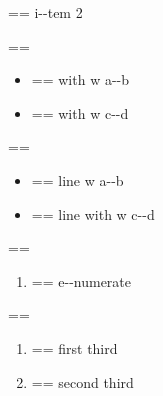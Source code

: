 \documentclass{book}
\makeatletter
\newenvironment{Texinfopreformatted}{%
  \par\GNUTobeylines\obeyspaces\frenchspacing\parskip=\z@\parindent=\z@}{}
{\catcode`\^^M=13 \gdef\GNUTobeylines{\catcode`\^^M=13 \def^^M{\null\par}}}
\newenvironment{Texinfoindented}{\begin{list}{}{}\item\relax}{\end{list}}
\renewcommand{\_}{\Texinfounderscore\discretionary{}{}{}}
\makeatother
\begin{document}
\begin{Texinfoindented}
\begin{itemize}[label=\textbullet{} a--n itemize line]
\begin{Texinfopreformatted}
\ttfamily i{-}{-}tem 2
\end{Texinfopreformatted}
\end{itemize}
\begin{Texinfopreformatted}%
\ttfamily 
\end{Texinfopreformatted}
\begin{itemize}[label={}]
\item \begin{Texinfopreformatted}%
\ttfamily with w a{-}{-}b
\end{Texinfopreformatted}
\item \begin{Texinfopreformatted}%
\ttfamily with w c{-}{-}d
\end{Texinfopreformatted}
\end{itemize}
\begin{Texinfopreformatted}%
\ttfamily 
\end{Texinfopreformatted}
\begin{itemize}[label=\hbox{} on a line]
\item \begin{Texinfopreformatted}%
\ttfamily line w a{-}{-}b
\end{Texinfopreformatted}
\item \begin{Texinfopreformatted}%
\ttfamily line with w c{-}{-}d
\end{Texinfopreformatted}
\end{itemize}
\begin{Texinfopreformatted}%
\ttfamily 
\end{Texinfopreformatted}
\begin{enumerate}[start=1]
\item \begin{Texinfopreformatted}%
\ttfamily e{-}{-}numerate
\end{Texinfopreformatted}
\end{enumerate}
\begin{Texinfopreformatted}%
\ttfamily 
\end{Texinfopreformatted}
\begin{enumerate}[start=3]
\item \begin{Texinfopreformatted}%
\ttfamily first third
\end{Texinfopreformatted}
\item \begin{Texinfopreformatted}%
\ttfamily second third
\end{Texinfopreformatted}

\end{enumerate}
\end{Texinfoindented}
\end{document}
